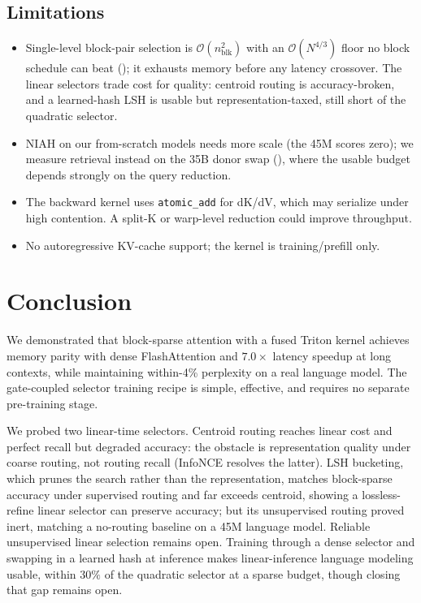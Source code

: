 \documentclass[10pt,letterpaper]{article}
\newcommand{\Ocomplex}{\mathcal{O}}
\begin{document}
\subsection{Limitations}

\begin{itemize}[leftmargin=*,itemsep=2pt]
\item Single-level block-pair selection is $\Ocomplex(n_{\text{blk}}^2)$ with
  an $\Ocomplex(N^{4/3})$ floor no block schedule can beat ();
  it exhausts memory before any latency crossover. The linear selectors trade
  cost for quality: centroid routing is accuracy-broken, and a learned-hash LSH
  is usable but representation-taxed, still short of the quadratic selector.
\item NIAH on our from-scratch models needs more scale (the 45M scores zero); we
  measure retrieval instead on the 35B donor swap (), where the
  usable budget depends strongly on the query reduction.
\item The backward kernel uses \texttt{atomic\_add} for dK/dV, which may
  serialize under high contention. A split-K or warp-level reduction could
  improve throughput.
\item No autoregressive KV-cache support; the kernel is training/prefill only.
\end{itemize}

\section{Conclusion}\label{sec:conclusion}

We demonstrated that block-sparse attention with a fused Triton kernel
achieves memory parity with dense FlashAttention and $7.0\times$ latency
speedup at long contexts, while maintaining within-4\% perplexity on a real
language model. The gate-coupled selector training recipe is simple,
effective, and requires no separate pre-training stage.

We probed two linear-time selectors. Centroid routing reaches linear cost and
perfect recall but degraded accuracy: the obstacle is representation quality
under coarse routing, not routing recall (InfoNCE resolves the latter). LSH
bucketing, which prunes the search rather than the representation, matches
block-sparse accuracy under supervised routing and far exceeds centroid, showing
a lossless-refine linear selector can preserve accuracy; but its unsupervised
routing proved inert, matching a no-routing baseline on a 45M language model.
Reliable unsupervised linear selection remains open. Training through a dense
selector and swapping in a learned hash at inference makes linear-inference
language modeling usable, within $30\%$ of the quadratic selector at a sparse
budget, though closing that gap remains open.
\end{document}
